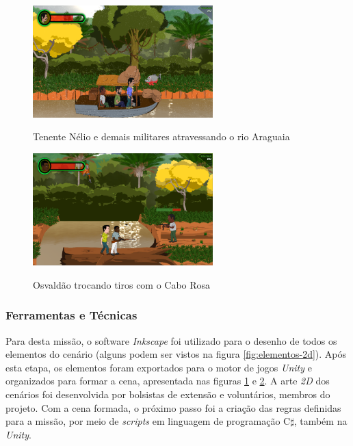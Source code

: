 \begin{figure}[H]
	\centering
	\caption{Tenente Nélio e demais militares atravessando o rio Araguaia}
	\includegraphics[width=0.62\textwidth]{figuras/nelio_barco.png}
	\label{fig:nelio_barco}
	{}
\end{figure}

\begin{figure}[H]
	\centering
	\caption{Osvaldão trocando tiros com o Cabo Rosa}
	\includegraphics[width=0.62\textwidth]{figuras/osvaldao_tiros_cabo.png}
	\label{fig:osvaldao_tiros_cabo}
	{}
\end{figure}

\subsubsection{Ferramentas e Técnicas}

Para desta missão, o software \textit{Inkscape} foi utilizado para o desenho de todos os elementos do cenário (alguns podem ser vistos na figura \ref{fig:elementos-2d}). Após esta etapa, os elementos foram exportados para o motor de jogos \textit{Unity} e organizados para formar a cena, apresentada nas figuras \ref{fig:nelio_barco} e \ref{fig:osvaldao_tiros_cabo}. A arte \textit{2D} dos cenários foi desenvolvida por bolsistas de extensão e voluntários, membros do projeto. Com a cena formada, o próximo passo foi a criação das regras definidas para a missão, por meio de \textit{scripts} em linguagem de programação C$\sharp$, também na \textit{Unity}.


